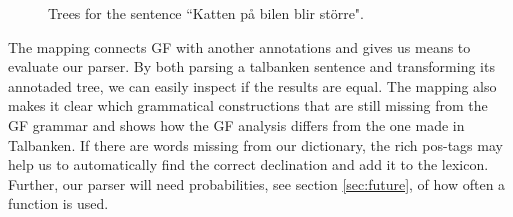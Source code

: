 \documentclass{report}
\begin{document}
\begin{figure}[h]
\centering
{}
\caption{Trees for the sentence ``Katten på bilen blir större".}
\label{fig:translationtrees}
\end{figure}

The mapping connects GF with another annotations and gives us means to evaluate
our parser. By both parsing a talbanken sentence and transforming its annotaded tree, we can
easily inspect if the results are equal.
The mapping also makes it clear which grammatical constructions that are still missing
from the GF grammar and shows how the GF analysis differs from the one made
in Talbanken.
If there are words missing from our dictionary, the rich
pos-tags may help us to automatically find the correct declination and add it to the
lexicon. Further, our parser will need probabilities, see section
\ref{sec:future}, of how often a function is used.\\
\end{document}
